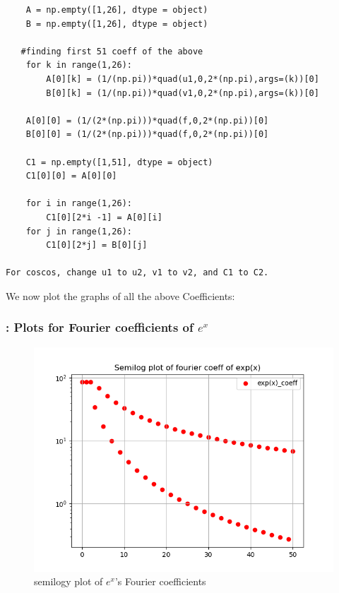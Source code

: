 \documentclass[11pt]{article}
\begin{document}
\begin{verbatim}
    A = np.empty([1,26], dtype = object)
    B = np.empty([1,26], dtype = object)

   #finding first 51 coeff of the above
    for k in range(1,26):
    	A[0][k] = (1/(np.pi))*quad(u1,0,2*(np.pi),args=(k))[0]
    	B[0][k] = (1/(np.pi))*quad(v1,0,2*(np.pi),args=(k))[0]
    
    A[0][0] = (1/(2*(np.pi)))*quad(f,0,2*(np.pi))[0]
    B[0][0] = (1/(2*(np.pi)))*quad(f,0,2*(np.pi))[0]
    
    C1 = np.empty([1,51], dtype = object)
    C1[0][0] = A[0][0]
    
    for i in range(1,26):
    	C1[0][2*i -1] = A[0][i]
    for j in range(1,26):
    	C1[0][2*j] = B[0][j]
    	
For coscos, change u1 to u2, v1 to v2, and C1 to C2.
\end{verbatim}
 \noindent We now plot the graphs of all the above Coefficients:
 \subsubsection{: Plots for Fourier coefficients of $e^{x}$}
 
 
\begin{figure}[H]
    \centering
    \includegraphics[scale = 0.5]{Figure_3.png}
    \caption{semilogy plot of $e^{x}$'s Fourier coefficients}
\end{figure}
\end{document}
